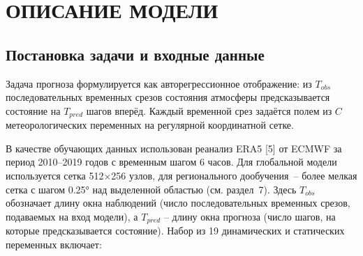 \documentclass[14pt,a4paper]{extarticle}
\numberwithin{table}{section}
\numberwithin{figure}{section}
\numberwithin{equation}{section}
\begin{document}
\newpage

\section{ОПИСАНИЕ МОДЕЛИ}\label{ux43eux43fux438ux441ux430ux43dux438ux435-ux43cux43eux434ux435ux43bux438}

\subsection{Постановка задачи и входные данные}\label{ux43fux43eux441ux442ux430ux43dux43eux432ux43aux430-ux437ux430ux434ux430ux447ux438-ux438-ux432ux445ux43eux434ux43dux44bux435-ux434ux430ux43dux43dux44bux435}

Задача прогноза формулируется как авторегрессионное отображение: из
\(T_{obs}\) последовательных временных срезов состояния атмосферы
предсказывается состояние на \(T_{pred}\) шагов вперёд. Каждый временной
срез задаётся полем из \(C\) метеорологических переменных на регулярной
координатной сетке.

В качестве обучающих данных использован реанализ ERA5 {[}5{]} от ECMWF
за период 2010--2019 годов с временным шагом 6 часов. Для глобальной
модели используется сетка 512$\times$256 узлов, для регионального
дообучения~-- более мелкая сетка с шагом 0.25° над выделенной
областью (см. раздел~7). Здесь \(T_{obs}\) обозначает длину окна
наблюдений (число последовательных временных срезов, подаваемых на
вход модели), а \(T_{pred}\) -- длину окна прогноза (число шагов,
на которые предсказывается состояние). Набор из 19 динамических и
статических переменных включает:
\end{document}
